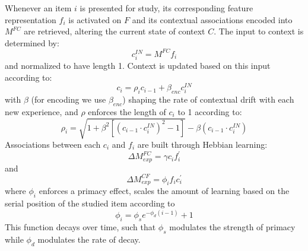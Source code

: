 {}\markdownRendererInterblockSeparator
{}Whenever an item $i$ is presented for study, its corresponding feature representation $f_i$ is activated on $F$ and its contextual associations encoded into $M^{FC}$ are retrieved, altering the current state of context $C$.\markdownRendererInterblockSeparator
{}The input to context is determined by:\markdownRendererInterblockSeparator
{}\begin{equation} \label{eq:3} c^{IN}_{i} = M^{FC}f_{i} \end{equation}\markdownRendererInterblockSeparator
{}and normalized to have length 1. Context is updated based on this input according to:\markdownRendererInterblockSeparator
{}\begin{equation} \label{eq:4} c_i = \rho_ic_{i-1} + \beta_{enc} c_{i}^{IN} \end{equation}\markdownRendererInterblockSeparator
{}with $\beta$ (for encoding we use $\beta_{enc}$) shaping the rate of contextual drift with each new experience, and $\rho$ enforces the length of $c_i$ to 1 according to:\markdownRendererInterblockSeparator
{}\begin{equation} \label{eq:5} \rho_i = \sqrt{1 + \beta^2\left[\left(c_{i-1} \cdot c^{IN}_i\right)^2 - 1\right]} - \beta\left(c_{i-1} \cdot c^{IN}_i\right)\end{equation}\markdownRendererInterblockSeparator
{}Associations between each $c_i$ and $f_i$ are built through Hebbian learning:\markdownRendererInterblockSeparator
{}\begin{equation} \label{eq:6 }\Delta M^{FC}_{exp} = \gamma c_i f^{'}_i \end{equation}\markdownRendererInterblockSeparator
{}and\markdownRendererInterblockSeparator
{}\begin{equation} \label{eq:7} \Delta M^{CF}_{exp} = \phi_i f_i c^{'}_i \end{equation}\markdownRendererInterblockSeparator
{}where $\phi_i$ enforces a primacy effect, scales the amount of learning based on the serial position of the studied item according to\markdownRendererInterblockSeparator
{}\begin{equation} \label{eq:8} \phi_i = \phi_se^{-\phi_d(i-1)} + 1 \end{equation}\markdownRendererInterblockSeparator
{}This function decays over time, such that $\phi_{s}$ modulates the strength of primacy while $\phi_{d}$ modulates the rate of decay.\markdownRendererInterblockSeparator
{}\markdownRendererInterblockSeparator
